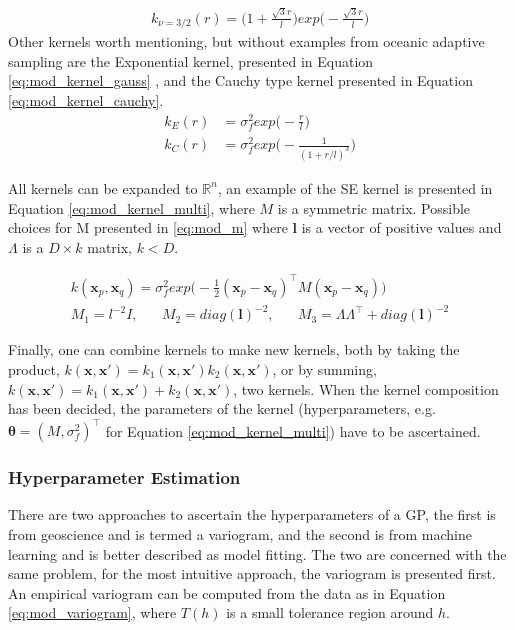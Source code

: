 \begin{align}
\label{eq:mod_kernel_matern_1}
    k_{\nu=3/2}(r) = \Big(1 + \frac{\sqrt{3}r}{l}\Big)exp\Big(-\frac{\sqrt{3}r}{l}\Big)
\end{align}
Other kernels worth mentioning, but without examples from oceanic adaptive sampling are the Exponential kernel, presented in Equation \eqref{eq:mod_kernel_gauss} \cite{eidsvik2015value}, and the Cauchy type kernel presented in Equation \eqref{eq:mod_kernel_cauchy}. 
\begin{align}
    \label{eq:mod_kernel_gauss}
    k_E(r) &= \sigma_f^2 exp\Big(-\frac{r}{l}\Big) \\ 
    \label{eq:mod_kernel_cauchy}
    k_C(r) &= \sigma_f^2 exp\Big(-\frac{1}{(1+r/l)^3}\Big)
\end{align}

All kernels can be expanded to $\mathbb{R}^n$, an example of the SE kernel is presented in Equation \eqref{eq:mod_kernel_multi}, where $M$ is a symmetric matrix. Possible choices for M presented in \eqref{eq:mod_m} where $\mathbf{l}$ is a vector of positive values and $\Lambda$ is a $D\times k$ matrix, $k<D$.

\begin{align}
\label{eq:mod_kernel_multi}
    k(\mathbf{x}_p,\mathbf{x}_q) = \sigma_f^2 exp\Big(-\frac{1}{2}(\mathbf{x}_p-\mathbf{x}_q)^{\intercal}M (\mathbf{x}_p-\mathbf{x}_q) \Big)\\ 
    \label{eq:mod_m}
    M_1 = l^{-2}I, \hspace{20pt} M_2 = diag(\mathbf{l})^{-2}, \hspace{20pt} M_3 = \Lambda \Lambda^{\intercal} + diag(\mathbf{l})^{-2} 
\end{align}


Finally, one can combine kernels to make new kernels, both by taking the product, $k(\mathbf{x},\mathbf{x}')=k_1(\mathbf{x},\mathbf{x}')k_2(\mathbf{x},\mathbf{x}')$, or by summing, $k(\mathbf{x},\mathbf{x}')=k_1(\mathbf{x},\mathbf{x}')+k_2(\mathbf{x},\mathbf{x}')$, two kernels. When the kernel composition has been decided, the parameters of the kernel (hyperparameters, e.g. $\mathbf{\theta} = (M,\sigma_f^2)^{\intercal}$ for Equation \eqref{eq:mod_kernel_multi}) have to be ascertained.

\subsubsection*{Hyperparameter Estimation}
There are two approaches to ascertain the hyperparameters of a GP, the first is from geoscience and is termed a variogram, and the second is from machine learning and is better described as model fitting. The two are concerned with the same problem, for the most intuitive approach, the variogram is presented first. An empirical variogram can be computed from the data as in Equation \eqref{eq:mod_variogram}, where $T(h)$ is a small tolerance region around $h$.

